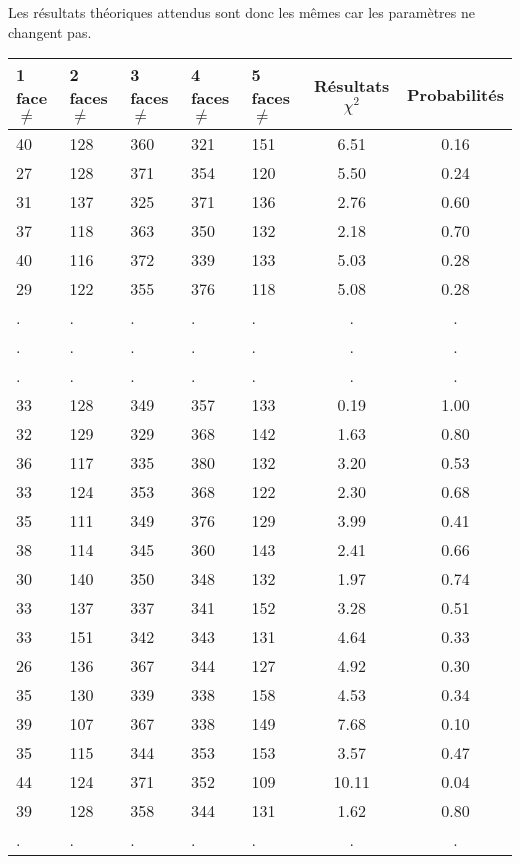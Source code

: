 \documentclass[12pt,a4paper]{article}
\begin{document}
Les résultats théoriques attendus sont donc les mêmes car les paramètres ne
changent pas.
\begin{center}
\begin{tabular}{|l|l|l|l|l|c|c|}
\hline
1 face $\neq$ & 2 faces $\neq$  & 3 faces $\neq$ & 4 faces $\neq$ & 5 faces $\neq$ & Résultats $\chi^2$ & Probabilités \\
\hline \hline
40 & 128 & 360 & 321 & 151 &  6.51 &  0.16\\ \hline
27 & 128 & 371 & 354 & 120 &  5.50 &  0.24\\ \hline
31 & 137 & 325 & 371 & 136 &  2.76 &  0.60\\ \hline
37 & 118 & 363 & 350 & 132 &  2.18 &  0.70\\ \hline
40 & 116 & 372 & 339 & 133 &  5.03 &  0.28\\ \hline
29 & 122 & 355 & 376 & 118 &  5.08 &  0.28\\ \hline
 . & . & . & . & . & . & . \\ \hline
 . & . & . & . & . & . & . \\ \hline
 . & . & . & . & . & . & . \\ \hline
33 & 128 & 349 & 357 & 133 &  0.19 &  1.00\\ \hline
32 & 129 & 329 & 368 & 142 &  1.63 &  0.80\\ \hline
36 & 117 & 335 & 380 & 132 &  3.20 &  0.53\\ \hline
33 & 124 & 353 & 368 & 122 &  2.30 &  0.68\\ \hline
35 & 111 & 349 & 376 & 129 &  3.99 &  0.41\\ \hline
38 & 114 & 345 & 360 & 143 &  2.41 &  0.66\\ \hline
30 & 140 & 350 & 348 & 132 &  1.97 &  0.74\\ \hline
33 & 137 & 337 & 341 & 152 &  3.28 &  0.51\\ \hline
33 & 151 & 342 & 343 & 131 &  4.64 &  0.33\\ \hline
26 & 136 & 367 & 344 & 127 &  4.92 &  0.30\\ \hline
35 & 130 & 339 & 338 & 158 &  4.53 &  0.34\\ \hline
39 & 107 & 367 & 338 & 149 &  7.68 &  0.10\\ \hline
35 & 115 & 344 & 353 & 153 &  3.57 &  0.47\\ \hline
44 & 124 & 371 & 352 & 109 & 10.11 &  0.04\\ \hline
39 & 128 & 358 & 344 & 131 &  1.62 &  0.80\\ \hline
 . & . & . & . & . & . & . \\ \hline

\end{tabular}
\end{center}
\end{document}
